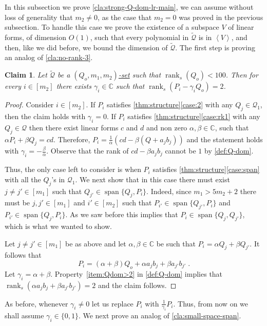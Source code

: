 \documentclass[10pt,a4paper]{article}
\newtheorem{claim}[theorem]{Claim}
\def\rank{\operatorname{rank}}
\renewcommand{\C}{\mathbb{C}}
\newcommand{\cQ}{{\mathcal{Q}}}
\newcommand{\ideal}[1]{\left \langle{#1}\right \rangle}
\newcommand{\spn}[1]{\operatorname{span}\{{#1}\}}
\newcommand{\rkq}{100}
\begin{document}
In this subsection we prove  \autoref{cla:strong-Q-dom-lr-main}, we can assume without loss of generality that $m_2 \neq 0$, as the case that $m_2=0$ was proved in the previous subsection.
To handle this case we prove the existence of a subspace $V$ of linear forms, of dimension $O(1)$, such that every polynomial in $\tilde{\cQ}$ is in $\ideal{V}$, and then, like we did before, we bound the dimension of $\tilde{\cQ}$. The first step is proving an analog of \autoref{cla:no-rank-3}.

\begin{claim}\label{cla:Q-and-rank-2}
Let $\tilde{\cQ}$ be a \hyperref[def:Q-dom]{$(Q_o,m_1,m_2)$-set} such that $\rank_s(Q_o)< \rkq$. Then for every $i \in [m_2]$ there exists $ \gamma_i\in \C$  such that $\rank_s(P_i-\gamma_i Q_o) = 2$.
\end{claim}

\begin{proof}
Consider $i\in [m_2]$. If $P_i$ satisfies \autoref{thm:structure}\ref{case:2} with any $Q_j\in \cQ_1$, then the claim holds with $\gamma_i=0$. 
If $P_i$ satisfies \autoref{thm:structure}\ref{case:rk1} with any $Q_j\in \cQ$ then there exist linear forms  $c$ and $d$ and non zero $\alpha, \beta \in \C$, such that $\alpha P_i + \beta Q_j = cd$. Therefore, $
P_i = \frac{1}{\alpha}(cd - \beta (Q+a_j b_j))$
and the statement holds with $\gamma_i = -\frac{\beta}{\alpha}$. Observe that the rank of $cd - \beta a_j b_j$ cannot be $1$ by \autoref{def:Q-dom}.


Thus, the only case left to consider is when $P_i$ satisfies  \autoref{thm:structure}\ref{case:span} with all the $Q_j$'s in $\cQ_1$. 
We next show that in this case there must exist $j\neq j' \in [m_1]$ such that $Q_{j'}\in \spn{Q_j,P_i}$. Indeed,  since $m_1 >  5m_2+2$ there must be $j,j'\in[m_1]$ and $i'\in[m_2]$ such that
$P_{i'} \in \spn{Q_{j'}, P_i}$ and $ P_{i'} \in \spn{Q_{j}, P_i}$. As we saw before this implies that $P_i \in \spn{Q_j,Q_{j'}}$, which is what we wanted to show.

Let  $j \neq j' \in [m_1]$ be as above and let $\alpha, \beta \in \C$ be such that $P_i =\alpha Q_j + \beta Q_{j'}$.  It follows that
\[
P_i = (\alpha + \beta)Q_o+ \alpha a_j b_j + \beta a_{j'} b_{j'}\;.
\] 
Let $\gamma_i = \alpha + \beta$. Property~\ref{item:Qdom>2} in \autoref{def:Q-dom} implies that $\rank_s(\alpha a_j b_j + \beta a_{j'} b_{j'})=2$ and the claim follows.
\end{proof}

As before, whenever $\gamma_i\neq 0$ let us replace $P_i$ with $\frac{1}{\gamma_i}P_i$. Thus, from now on we shall assume $\gamma_i \in \{0,1\}$.
We next prove an analog of \autoref{cla:small-space-span}.
\end{document}
